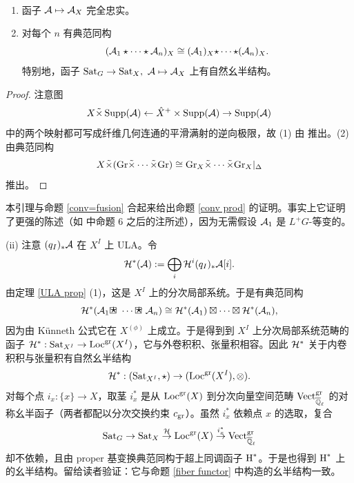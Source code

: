 \begin{lem}~
\begin{enumerate}
\item 函子 ${\mathcal A}\mapsto {\mathcal A}_X$ 完全忠实。
\item 对每个 $n$ 有典范同构
\[({\mathcal A}_1\star\cdots\star{\mathcal A}_n)_X\cong ({\mathcal A}_1)_X\text{$\star$}\cdots\text{$\star$}({\mathcal A}_n)_X.\]
特别地，函子 ${\operatorname{Sat}}_G\to {\operatorname{Sat}}_X,\ {\mathcal A}\mapsto {\mathcal A}_X$ 上有自然幺半结构。
\end{enumerate}
\end{lem}

\begin{proof}
注意图
\[X\tilde\times \operatorname{Supp}({\mathcal A})\leftarrow \hat X^+\times \operatorname{Supp}({\mathcal A})\to \operatorname{Supp}({\mathcal A})\]
中的两个映射都可写成纤维几何连通的平滑满射的逆向极限，故 (1) 由 \cite[Proposition 4.2.5]{BBD} 推出。(2) 由典范同构
\[X\tilde\times ({\operatorname{Gr}}\tilde\times\cdots\tilde\times{\operatorname{Gr}})\cong {\operatorname{Gr}}_X\tilde\times\cdots\tilde\times{\operatorname{Gr}}_X|_\Delta\]
推出。
\end{proof}

\begin{rmk}\label{conv perverse}
本引理与命题 \ref{conv=fusion} 合起来给出命题 \ref{conv prod} 的证明。事实上它证明了更强的陈述（如 \cite{Ga} 中命题 6 之后的注所述），因为无需假设 ${\mathcal A}_1$ 是 $L^+G$-等变的。
\end{rmk}

(ii) 注意 $(q_I)_*{\mathcal A}$ 在 $X^I$ 上 ULA。令
\begin{equation}\label{relative coh}
{\mathcal H}^*({\mathcal A}):=\bigoplus_i {\mathcal H}^i(q_I)_*{\mathcal A}[i].
\end{equation}
由定理 \ref{ULA prop} (1)，这是 $X^I$ 上的分次局部系统。于是有典范同构
\begin{equation}\label{monoidal functor}
\mH^*(\mA_1\boxstar\cdots\boxstar\mA_n)\cong \mH^*(\mA_1)\boxtimes\cdots\boxtimes\mH^*(\mA_n),
\end{equation}
因为由 K\"unneth 公式它在 $X^{(\phi)}$ 上成立。于是得到到 $X^I$ 上分次局部系统范畴的函子 ${\mathcal H}^*: {\operatorname{Sat}}_{X^I}\to \operatorname{Loc}^{\operatorname{gr}}(X^I)$，它与外卷积积、张量积相容。因此 ${\mathcal H}^*$ 关于内卷积积与张量积有自然幺半结构
\[{\mathcal H}^*: ({\operatorname{Sat}}_{X^I},\text{$\star$})\to (\operatorname{Loc}^{\operatorname{gr}}(X^I),\otimes).\]
对每个点 $i_x:\{x\}\to X$，取茎 $i_x^*$ 是从 $\operatorname{Loc}^{\operatorname{gr}}(X)$ 到分次向量空间范畴 $\operatorname{Vect}^{\operatorname{gr}}_{{\overline{{\mathbb Q}}_\ell}}$ 的对称幺半函子（两者都配以分次交换约束 $c_{\operatorname{gr}}$）。虽然 $i_x^*$ 依赖点 $x$ 的选取，复合
\begin{equation}\label{decomp coh}
{\operatorname{Sat}}_G\to {\operatorname{Sat}}_X\stackrel{{\mathcal H}}{\to} \operatorname{Loc}^{\operatorname{gr}}(X)\stackrel{i_x^*}{\to}\operatorname{Vect}^{\operatorname{gr}}_{{\overline{{\mathbb Q}}_\ell}}
\end{equation}
却不依赖，且由 proper 基变换典范同构于超上同调函子 $\operatorname{H}^*$。于是也得到 $\operatorname{H}^*$ 上的幺半结构。留给读者验证：它与命题 \ref{fiber functor} 中构造的幺半结构一致。

